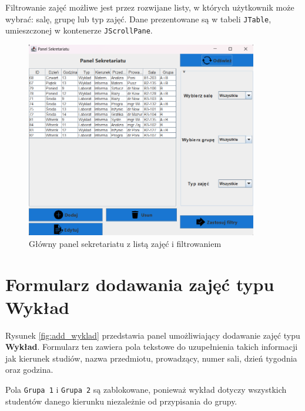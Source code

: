 Filtrowanie zajęć możliwe jest przez rozwijane listy, w których użytkownik może wybrać: salę, grupę lub typ zajęć. Dane prezentowane są w tabeli \texttt{JTable}, umieszczonej w kontenerze \texttt{JScrollPane}.

\begin{figure}[H]
\centering
\includegraphics[width=0.9\textwidth]{figures/workApl/mainpanel.png}
\caption{Główny panel sekretariatu z listą zajęć i filtrowaniem}
\label{fig:mainpanel}
\end{figure}

\clearpage

\section*{Formularz dodawania zajęć typu Wykład}

Rysunek \ref{fig:add_wyklad} przedstawia panel umożliwiający dodawanie zajęć typu \textbf{Wykład}. Formularz ten zawiera pola tekstowe do uzupełnienia takich informacji jak kierunek studiów, nazwa przedmiotu, prowadzący, numer sali, dzień tygodnia oraz godzina.

Pola \texttt{Grupa 1} i \texttt{Grupa 2} są zablokowane, ponieważ wykład dotyczy wszystkich studentów danego kierunku niezależnie od przypisania do grupy.

